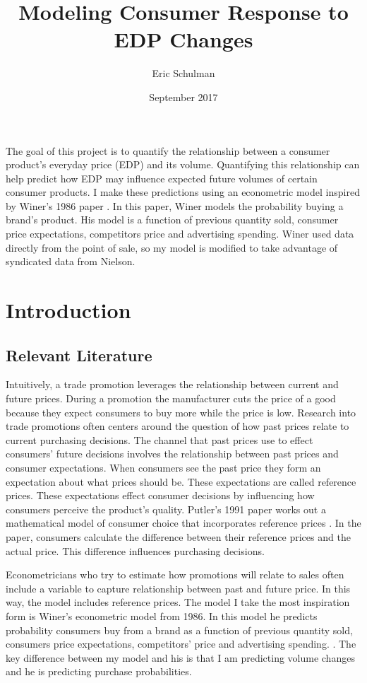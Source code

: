 \documentclass{article}
\title{Modeling Consumer Response to EDP Changes}
\author{Eric Schulman}
\date{September 2017}
\begin{document}
\maketitle

The goal of this project is to quantify the relationship between a consumer product's everyday price (EDP) and its volume. Quantifying this relationship can help predict how EDP may influence expected future volumes of certain consumer products. I make these predictions using an econometric model inspired by Winer's 1986 paper \cite{winer}. In this paper, Winer models the probability buying a brand's product. His model is a function of previous quantity sold, consumer price expectations, competitors price and advertising spending. Winer used data directly from the point of sale, so my model is modified to take advantage of syndicated data from Nielson.

\section{Introduction}

\subsection{Relevant Literature}

Intuitively, a trade promotion leverages the relationship between current and future prices. During a promotion the manufacturer cuts the price of a good because they expect consumers to buy more while the price is low. Research into trade promotions often centers around the question of how past prices relate to current purchasing decisions. The channel that past prices use to effect consumers' future decisions involves the relationship between past prices and consumer expectations. When consumers see the past price they form an expectation about what prices should be. These expectations are called reference prices. These expectations effect consumer decisions by influencing how consumers perceive the product's quality. Putler's 1991 paper works out a mathematical model of consumer choice that incorporates reference prices \cite{putler}. In the paper, consumers calculate the difference between their reference prices and the actual price. This difference influences purchasing decisions.

Econometricians who try to estimate how promotions will relate to sales often include a variable to capture relationship between past and future price. In this way, the model includes reference prices. The model I take the most inspiration form is Winer's econometric model from 1986. In this model he predicts probability consumers buy from a brand as a function of previous quantity sold, consumers price expectations, competitors' price and advertising spending.  \cite{winer}. The key difference between my model and his is that I am predicting volume changes and he is predicting purchase probabilities.
\end{document}
